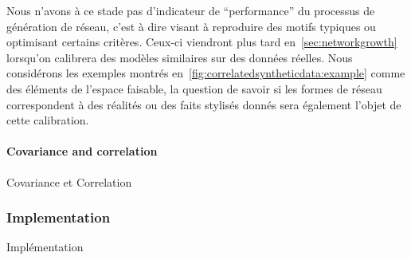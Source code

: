 Nous n'avons à ce stade pas d'indicateur de ``performance'' du processus de génération de réseau, c'est à dire visant à reproduire des motifs typiques ou optimisant certains critères. Ceux-ci viendront plus tard en~\ref{sec:networkgrowth} lorsqu'on calibrera des modèles similaires sur des données réelles. Nous considérons les exemples montrés en~\ref{fig:correlatedsyntheticdata:example} comme des éléments de l'espace faisable, la question de savoir si les formes de réseau correspondent à des réalités ou des faits stylisés donnés sera également l'objet de cette calibration.




\paragraph{Covariance and correlation}{Covariance et Correlation}





\subsubsection{Implementation}{Implémentation}


